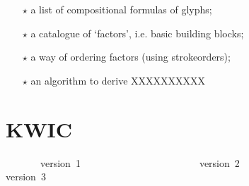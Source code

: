 
\FPmul{}%
\FPmul{}\begin{multicols}{2}\begin{itemize}\item[$\star$] a list of compositional formulas of glyphs;\mktsShowpar\par

\item[$\star$] a catalogue of ‘factors’, i.e. basic building blocks;\mktsShowpar\par

\item[$\star$] a way of ordering factors (using strokeorders);\mktsShowpar\par

\item[$\star$] an algorithm to derive XXXXXXXXXX\mktsShowpar\par

\end{itemize}\end{multicols}
\section{KWIC
}
\begin{multicols}{2}\end{multicols}\begingroup\mktsObeyAllLines{}

\begingroup\mktsStyleCode{}       version 1                        version 2                        version 3

